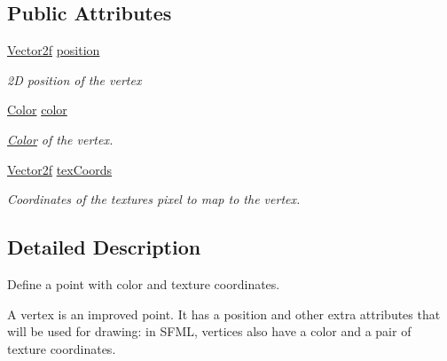 \subsection*{Public Attributes}
\begin{DoxyCompactItemize}
\item 
\mbox{\label{classsf_1_1_vertex_a8a4e0f4dfa7f1eb215c92e93d04f0ac0}} 
\mbox{\hyperlink{classsf_1_1_vector2}{Vector2f}} \mbox{\hyperlink{classsf_1_1_vertex_a8a4e0f4dfa7f1eb215c92e93d04f0ac0}{position}}
\begin{DoxyCompactList}\small\item\em 2D position of the vertex \end{DoxyCompactList}\item 
\mbox{\label{classsf_1_1_vertex_a799faa0629442e90f07cd2edb568ff80}} 
\mbox{\hyperlink{classsf_1_1_color}{Color}} \mbox{\hyperlink{classsf_1_1_vertex_a799faa0629442e90f07cd2edb568ff80}{color}}
\begin{DoxyCompactList}\small\item\em \mbox{\hyperlink{classsf_1_1_color}{Color}} of the vertex. \end{DoxyCompactList}\item 
\mbox{\label{classsf_1_1_vertex_a9e79bd05818d36c4789751908037097c}} 
\mbox{\hyperlink{classsf_1_1_vector2}{Vector2f}} \mbox{\hyperlink{classsf_1_1_vertex_a9e79bd05818d36c4789751908037097c}{tex\+Coords}}
\begin{DoxyCompactList}\small\item\em Coordinates of the texture\textquotesingle{}s pixel to map to the vertex. \end{DoxyCompactList}\end{DoxyCompactItemize}


\subsection{Detailed Description}
Define a point with color and texture coordinates. 

\begin{DoxyVerb}\end{DoxyVerb}


A vertex is an improved point. It has a position and other extra attributes that will be used for drawing\+: in S\+F\+ML, vertices also have a color and a pair of texture coordinates.


